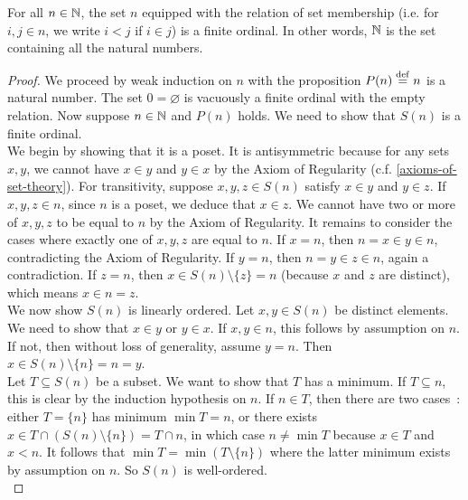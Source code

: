 \begin{lemma} \label{natural-numbers-are-finite-ordinals}
    For all $n \in \operatorname{\mathbb N}$, the set $n$ equipped with the relation of set membership (i.e. for $i,j \in n$, we write $i < j$ if $i \in j$) is a finite ordinal. In other words, $\operatorname{\mathbb N}$ is the set containing all the natural numbers.
\end{lemma}

\begin{proof}
    We proceed by weak induction on $n$ with the proposition $P(n) \overset{\mathrm{def}}{=} n$ is a natural number. The set $0 = \varnothing$ is vacuously a finite ordinal with the empty relation. Now suppose $n \in \operatorname{\mathbb N}$ and $P(n)$ holds. We need to show that $S(n)$ is a finite ordinal. 
    \\

    We begin by showing that it is a poset. It is antisymmetric because for any sets $x,y$, we cannot have $x \in y$ and $y \in x$ by the Axiom of Regularity (c.f. \autoref{axioms-of-set-theory}). For transitivity, suppose $x,y,z \in S(n)$ satisfy $x \in y$ and $y \in z$. If $x,y,z \in n$, since $n$ is a poset, we deduce that $x \in z$. We cannot have two or more of $x,y,z$ to be equal to $n$ by the Axiom of Regularity. It remains to consider the cases where exactly one of $x,y,z$ are equal to $n$. If $x = n$, then $n = x \in y \in n$, contradicting the Axiom of Regularity. If $y = n$, then $n = y \in z \in n$, again a contradiction. If $z = n$, then $x \in S(n) \setminus \{z\} = n$ (because $x$ and $z$ are distinct), which means $x \in n = z$.
    \\

    We now show $S(n)$ is linearly ordered. Let $x,y \in S(n)$ be distinct elements. We need to show that $x \in y$ or $y \in x$. If $x,y \in n$, this follows by assumption on $n$. If not, then without loss of generality, assume $y = n$. Then $x \in S(n) \setminus \{n\} = n = y$.
    \\

    Let $T \subseteq S(n)$ be a subset. We want to show that $T$ has a minimum. If $T \subseteq n$, this is clear by the induction hypothesis on $n$. If $n \in T$, then there are two cases~: either $T = \{n\}$ has minimum $\min T = n$, or there exists $x \in T \cap (S(n) \setminus \{n\}) = T \cap n$, in which case $n \neq \min T$ because $x \in T$ and $x < n$. It follows that $\min T = \min(T \setminus \{n\})$ where the latter minimum exists by assumption on $n$. So $S(n)$ is well-ordered.
    \\


\end{proof}
